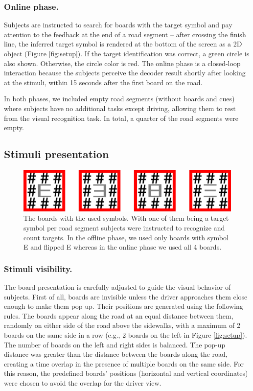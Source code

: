 \documentclass[12pt]{iopart}
\begin{document}
\subsubsection*{Online phase.}
Subjects are instructed to search for boards with the target symbol and pay attention to the feedback at the end of a road segment -- after crossing the finish line, the inferred target symbol is rendered at the bottom of the screen as a 2D object (Figure \ref{fig:setup}). 
If the target identification was correct, a green circle is also shown. Otherwise, the circle color is red.
The online phase is a closed-loop interaction because
the subjects perceive the decoder result shortly after
looking at the stimuli, within 15 seconds after the first board on the road.

In both phases, we included empty road segments (without boards and cues) where subjects have no additional tasks 
except driving, allowing them to rest from the visual recognition task.
In total, a quarter of the road segments were empty.

\subsection{Stimuli presentation}
\label{sec:stim}

\begin{figure}[!t]
\center
    \includegraphics[trim={0cm 0cm 0cm 0cm},clip,width=0.80\columnwidth]{../images/Stimuli.png}
    \caption{The boards with the used symbols. With one of them being a target symbol per road segment
        subjects were instructed to recognize and count targets. In the offline phase, we used only boards 
        with symbol E and flipped E whereas in the online phase we used all 4 boards.}
\label{fig:boards}
\end{figure}

\subsubsection{Stimuli visibility.}
The board presentation is carefully adjusted to guide the visual behavior of subjects.
First of all, boards are invisible unless the driver approaches them
close enough to make them pop up.
Their positions are generated using the following rules.
The boards appear along the road at an equal distance between them, 
randomly on either side of the road above the sidewalks,
with a maximum of 2 boards
on the same side in a row  (e.g., 2 boards on the left in Figure \ref{fig:setup}). The number of boards on the left
and right sides is balanced. The pop-up distance was greater than the distance between the boards along the road, creating a time overlap in the presence of multiple boards on the same side. For this reason, the predefined  boards' positions (horizontal and vertical coordinates) were chosen to avoid the overlap for the driver view.
\end{document}
